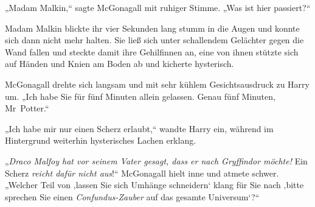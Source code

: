 „Madam Malkin,“ sagte McGonagall mit ruhiger Stimme. „Was ist hier passiert?“

Madam Malkin blickte ihr vier Sekunden lang stumm in die Augen und konnte sich dann nicht mehr halten. Sie ließ sich unter schallendem Gelächter gegen die Wand fallen und steckte damit ihre Gehilfinnen an, eine von ihnen stützte sich auf Händen und Knien am Boden ab und kicherte hysterisch.

McGonagall drehte sich langsam und mit sehr kühlem Gesichtsausdruck zu Harry um. „Ich habe Sie für fünf Minuten allein gelassen. Genau fünf Minuten, Mr~Potter.“

„Ich habe mir nur einen Scherz erlaubt,“ wandte Harry ein, während im Hintergrund weiterhin hysterisches Lachen erklang.

„\emph{Draco Malfoy hat vor seinem Vater gesagt, dass er nach Gryffindor möchte!} Ein Scherz \emph{reicht dafür nicht aus}!“ McGonagall hielt inne und atmete schwer. „Welcher Teil von ‚lassen Sie sich Umhänge schneidern‘ klang für Sie nach ‚bitte sprechen Sie einen \emph{Confundus-Zauber} auf das gesamte Universum‘?“

